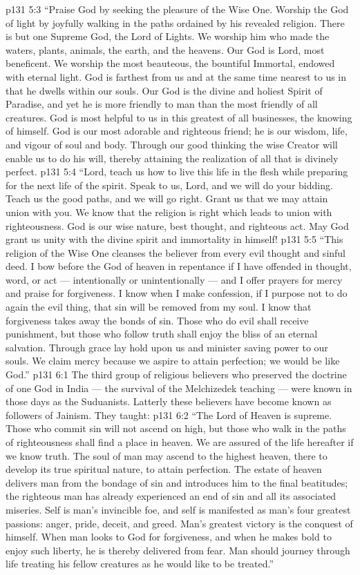 \vs p131 5:3 “Praise God by seeking the pleasure of the Wise One. Worship the God of light by joyfully walking in the paths ordained by his revealed religion. There is but one Supreme God, the Lord of Lights. We worship him who made the waters, plants, animals, the earth, and the heavens. Our God is Lord, most beneficent. We worship the most beauteous, the bountiful Immortal, endowed with eternal light. God is farthest from us and at the same time nearest to us in that he dwells within our souls. Our God is the divine and holiest Spirit of Paradise, and yet he is more friendly to man than the most friendly of all creatures. God is most helpful to us in this greatest of all businesses, the knowing of himself. God is our most adorable and righteous friend; he is our wisdom, life, and vigour of soul and body. Through our good thinking the wise Creator will enable us to do his will, thereby attaining the realization of all that is divinely perfect.
\vs p131 5:4 “Lord, teach us how to live this life in the flesh while preparing for the next life of the spirit. Speak to us, Lord, and we will do your bidding. Teach us the good paths, and we will go right. Grant us that we may attain union with you. We know that the religion is right which leads to union with righteousness. God is our wise nature, best thought, and righteous act. May God grant us unity with the divine spirit and immortality in himself!
\vs p131 5:5 “This religion of the Wise One cleanses the believer from every evil thought and sinful deed. I bow before the God of heaven in repentance if I have offended in thought, word, or act --- intentionally or unintentionally --- and I offer prayers for mercy and praise for forgiveness. I know when I make confession, if I purpose not to do again the evil thing, that sin will be removed from my soul. I know that forgiveness takes away the bonds of sin. Those who do evil shall receive punishment, but those who follow truth shall enjoy the bliss of an eternal salvation. Through grace lay hold upon us and minister saving power to our souls. We claim mercy because we aspire to attain perfection; we would be like God.”
\vs p131 6:1 The third group of religious believers who preserved the doctrine of one God in India --- the survival of the Melchizedek teaching --- were known in those days as the Suduanists. Latterly these believers have become known as followers of Jainism. They taught:
\vs p131 6:2 \pc “The Lord of Heaven is supreme. Those who commit sin will not ascend on high, but those who walk in the paths of righteousness shall find a place in heaven. We are assured of the life hereafter if we know truth. The soul of man may ascend to the highest heaven, there to develop its true spiritual nature, to attain perfection. The estate of heaven delivers man from the bondage of sin and introduces him to the final beatitudes; the righteous man has already experienced an end of sin and all its associated miseries. Self is man’s invincible foe, and self is manifested as man’s four greatest passions: anger, pride, deceit, and greed. Man’s greatest victory is the conquest of himself. When man looks to God for forgiveness, and when he makes bold to enjoy such liberty, he is thereby delivered from fear. Man should journey through life treating his fellow creatures as he would like to be treated.”
